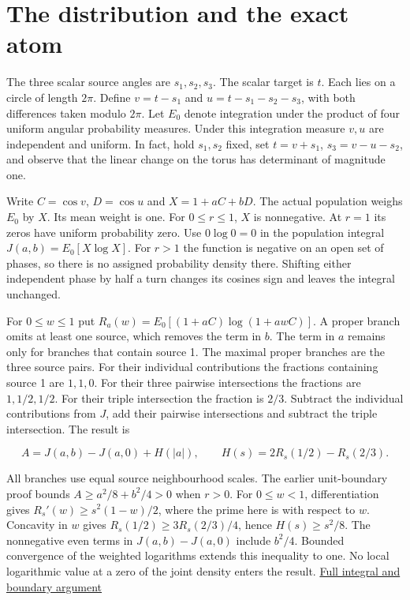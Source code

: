\clearpage

\section{The distribution and the exact atom}\label{the-distribution-and-the-exact-atom}

The three scalar source angles are \(s_1,s_2,s_3\). The scalar target is \(t\). Each lies on a circle of length \(2\pi\). Define \(v=t-s_1\) and \(u=t-s_1-s_2-s_3\), with both differences taken modulo \(2\pi\). Let \(E_0\) denote integration under the product of four uniform angular probability measures. Under this integration measure \(v,u\) are independent and uniform. In fact, hold \(s_1,s_2\) fixed, set \(t=v+s_1\), \(s_3=v-u-s_2\), and observe that the linear change on the torus has determinant of magnitude one.

Write \(C=\cos v\), \(D=\cos u\) and \(X=1+aC+bD\). The actual population weighs \(E_0\) by \(X\). Its mean weight is one. For \(0\le r\le1\), \(X\) is nonnegative. At \(r=1\) its zeros have uniform probability zero. Use \(0\log0=0\) in the population integral \(J(a,b)=E_0[X\log X]\). For \(r>1\) the function is negative on an open set of phases, so there is no assigned probability density there. Shifting either independent phase by half a turn changes its cosine\textquotesingle s sign and leaves the integral unchanged.

For \(0\le w\le1\) put \(R_a(w)=E_0[(1+aC)\log(1+awC)]\). A proper branch omits at least one source, which removes the term in \(b\). The term in \(a\) remains only for branches that contain source 1. The maximal proper branches are the three source pairs. For their individual contributions the fractions containing source 1 are \(1,1,0\). For their three pairwise intersections the fractions are \(1,1/2,1/2\). For their triple intersection the fraction is \(2/3\). Subtract the individual contributions from \(J\), add their pairwise intersections and subtract the triple intersection. The result is

\[
A=J(a,b)-J(a,0)+H(|a|),\qquad H(s)=2R_s(1/2)-R_s(2/3).
\]

All branches use equal source neighbourhood scales. The earlier unit-boundary proof bounds \(A\ge a^2/8+b^2/4>0\) when \(r>0\). For \(0\le w<1\), differentiation gives \(R_s'(w)\ge s^2(1-w)/2\), where the prime here is with respect to \(w\). Concavity in \(w\) gives \(R_s(1/2)\ge3R_s(2/3)/4\), hence \(H(s)\ge s^2/8\). The nonnegative even terms in \(J(a,b)-J(a,0)\) include \(b^2/4\). Bounded convergence of the weighted logarithms extends this inequality to one. No local logarithmic value at a zero of the joint density enters the result. \href{https://github.com/sepahead/pid-rs/blob/a6680cb824a3e1774cff06f9b6e4d1e8ec584056/audit/research/angular-unit-boundary/EXPOSITION.md}{Full integral and boundary argument}

